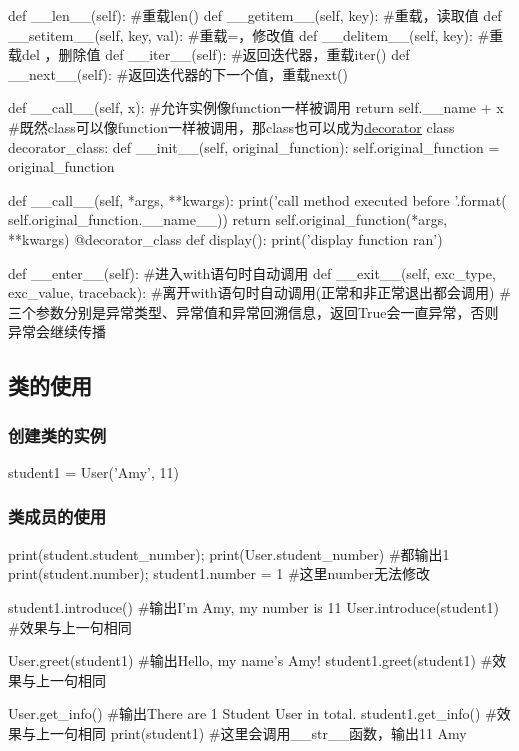\begin{codeblock}[language=python, caption={Special members for class}]
        def __len__(self): #重载len()
        def __getitem__(self, key): #重载\lbrack\rbrack，读取值
        def __setitem__(self, key, val): #重载\lbrack\rbrack=，修改值
        def __delitem__(self, key): #重载del \lbrack\rbrack，删除值
        def __iter__(self): #返回迭代器，重载iter()
        def __next__(self): #返回迭代器的下一个值，重载next()

        def __call__(self, x): #允许实例像function一样被调用
            return self.__name + x
        #既然class可以像function一样被调用，那class也可以成为\hyperref[subsubsec:decorator]{\underline{decorator}}
        class decorator_class:
            def __init__(self, original_function):
                self.original_function = original_function

            def __call__(self, *args, **kwargs):
                print('call method executed before {}'.format(
                    self.original_function.__name__))
                return self.original_function(*args, **kwargs)
        @decorator_class
        def display():
            print('display function ran')

        def __enter__(self): #进入with语句时自动调用
        def __exit__(self, exc_type, exc_value, traceback): 
        #离开with语句时自动调用(正常和非正常退出都会调用)
        #三个参数分别是异常类型、异常值和异常回溯信息，返回True会一直异常，否则异常会继续传播 
      \end{codeblock}
        
  \subsection{类的使用}
    \subsubsection{创建类的实例}
      \begin{codeblock}[language=python, caption={Create an instance of class}]
        student1 = User('Amy', 11) 
      \end{codeblock}

    \subsubsection{类成员的使用}
      \begin{codeblock}[language=python, caption={Using class members}]
        print(student.student_number); print(User.student_number) #都输出1
        print(student.number); student1.number = 1 #这里number无法修改

        student1.introduce() #输出I'm Amy, my number is 11
        User.introduce(student1) #效果与上一句相同

        User.greet(student1) #输出Hello, my name's Amy!
        student1.greet(student1) #效果与上一句相同

        User.get_info() #输出There are 1 Student User in total.
        student1.get_info() #效果与上一句相同
        print(student1) #这里会调用\_\_str\_\_函数，输出11 Amy
      \end{codeblock}


